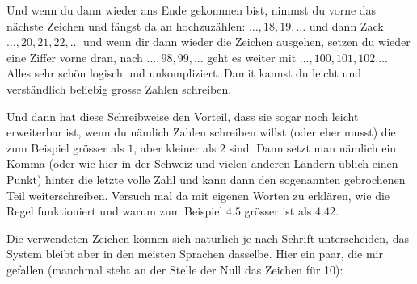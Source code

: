 Und wenn du dann wieder ans Ende gekommen bist, nimmst du vorne das nächste Zeichen und fängst da an hochzuzählen: $\dots, 18, 19,\dots$ und dann Zack $\dots, 20, 21, 22,\dots$ und wenn dir dann wieder die Zeichen ausgehen, setzen du wieder eine Ziffer vorne dran, nach $\dots, 98, 99,\dots$ geht es weiter mit $\dots, 100, 101,102\dots$. Alles sehr schön logisch und unkompliziert. Damit kannst du leicht und verständlich beliebig grosse Zahlen schreiben.


Und dann hat diese Schreibweise den Vorteil, dass sie sogar noch leicht erweiterbar ist, wenn du nämlich Zahlen schreiben willst (oder eher musst) die zum Beispiel grösser als $1$, aber kleiner als $2$ sind. Dann setzt man nämlich ein Komma (oder wie hier in der Schweiz und vielen anderen Ländern üblich einen Punkt) hinter die letzte volle Zahl und kann dann den sogenannten gebrochenen Teil weiterschreiben. Versuch mal da mit eigenen Worten zu erklären, wie die Regel funktioniert und warum zum Beispiel $4.5$ grösser ist als $4.42$.

Die verwendeten Zeichen können sich natürlich je nach Schrift unterscheiden, das System bleibt aber in den meisten Sprachen dasselbe. Hier ein paar, die mir gefallen (manchmal steht an der Stelle der Null das Zeichen für 10):

